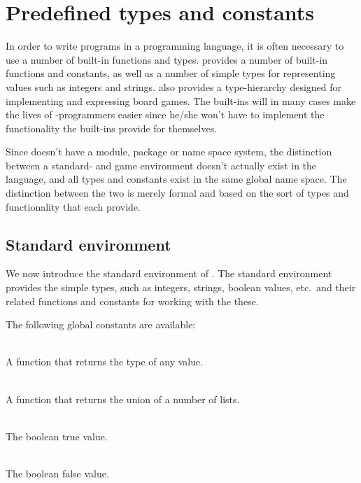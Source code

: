\section{Predefined types and constants}
\label{sec:predefined}

In order to write programs in a programming language, it is often necessary to use a number of built-in
functions and types. \productname{} provides a number of built-in functions and constants, as well as 
a number of simple types for representing values such as integers and strings. \productname{} also provides
a type-hierarchy designed for implementing and expressing board games. The built-ins will in many cases make
the lives of \productname{}-programmers easier since he/she won't have to implement the functionality the built-ins
provide for themselves. 

Since \productname{} doesn't have a module, package or name space system, the distinction between a standard-
and game environment doesn't actually exist in the language, and all types and constants exist in the same
global name space. The distinction between the two is merely formal and based on the sort of types and functionality
that each provide.
 
\subsection{Standard environment}
\label{sec:standardenvironment}

We now introduce the standard environment of \productname{}. The standard environment provides the simple types, such as
integers, strings, boolean values, etc.\ and their related functions and constants for working with the these.

The following global constants are available:

\begin{dlist}
  \item {}\\
    A function that returns the type of any value.
  \item {}\\
    A function that returns the union of a number of lists.
  \item {}\\
    The boolean true value.
  \item {}\\
    The boolean false value.
\end{dlist}


